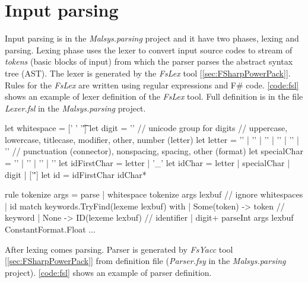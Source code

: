 \section{Input parsing}

Input parsing is in the \emph{Malsys.parsing} project and it have two phases, lexing and parsing.
Lexing phase uses the lexer to convert input source codes to stream of \emph{tokens} (basic blocks of input) from which the parser parses the abstract syntax tree (AST).
The lexer is generated by the \emph{FsLex} tool [\ref{sec:FSharpPowerPack}].
Rules for the \emph{FsLex} are written using regular expressions and F\# code.
\autoref{code:fsl} shows an example of lexer definition of the \emph{FsLex} tool.
Full definition is in the file \emph{Lexer.fsl} in the \emph{Malsys.parsing} project.

\begin{Fsharp}[label=code:fsl,caption={Example of definition file for \emph{FsLex}}]
let whitespace = [' ' '\t']
let digit = '\Nd'  // unicode group for digits
// uppercase, lowercase, titlecase, modifier, other, number (letter)
let letter = '\Lu' | '\Ll' | '\Lt' | '\Lm' | '\Lo' | '\Nl'
// punctuation (connector), nonspacing, spacing, other (format)
let specialChar = '\Pc' | '\Mn' | '\Mc' | '\Cf'
let idFirstChar = letter | '_'
let idChar = letter | specialChar | digit | ['\'']
let id = idFirstChar idChar*

rule tokenize args = parse
    | whitespace { tokenize args lexbuf }  // ignore whitespaces
    | id { match keywords.TryFind(lexeme lexbuf) with
        | Some(token) -> token  // keyword
        | None -> ID(lexeme lexbuf) }  // identifier
    | digit+ { parseInt args lexbuf ConstantFormat.Float }
    ...
\end{Fsharp}

After lexing comes parsing.
Parser is generated by \emph{FsYacc} tool [\ref{sec:FSharpPowerPack}] from definition file (\emph{Parser.fsy} in the \emph{Malsys.parsing} project).
\autoref{code:fsl} shows an example of parser definition.

